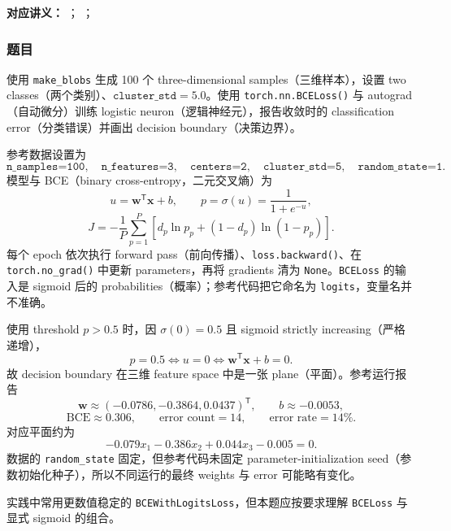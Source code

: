 
\textbf{对应讲义：}
；
；

\subsubsection*{题目}

使用 \texttt{make\_blobs} 生成 100 个 three-dimensional samples（三维样本），设置 two classes（两个类别）、$\texttt{cluster\_std}=5.0$。使用 \texttt{torch.nn.BCELoss()} 与 autograd（自动微分）训练 logistic neuron（逻辑神经元），报告收敛时的 classification error（分类错误）并画出 decision boundary（决策边界）。

\begin{checkedsolution}
参考数据设置为
\[
  \texttt{n\_samples=100},\quad
  \texttt{n\_features=3},\quad
  \texttt{centers=2},\quad
  \texttt{cluster\_std=5},\quad
  \texttt{random\_state=1}.
\]
模型与 BCE（binary cross-entropy，二元交叉熵）为
\[
  u=\bm w^{\mathsf T}\bm x+b,\qquad
  p=\sigma(u)=\frac{1}{1+e^{-u}},
\]
\[
  J=-\frac1P\sum_{p=1}^{P}
  \left[d_p\ln p_p+(1-d_p)\ln(1-p_p)\right].
\]
每个 epoch 依次执行 forward pass（前向传播）、\texttt{loss.backward()}、在 \texttt{torch.no\_grad()} 中更新 parameters，再将 gradients 清为 \texttt{None}。\texttt{BCELoss} 的输入是 sigmoid 后的 probabilities（概率）；参考代码把它命名为 \texttt{logits}，变量名并不准确。

使用 threshold $p>0.5$ 时，因 $\sigma(0)=0.5$ 且 sigmoid strictly increasing（严格递增），
\[
  p=0.5\iff u=0\iff\boxed{\bm w^{\mathsf T}\bm x+b=0}.
\]
故 decision boundary 在三维 feature space 中是一张 plane（平面）。参考运行报告
\[
  \bm w\approx(-0.0786,-0.3864,0.0437)^{\mathsf T},\qquad
  b\approx-0.0053,
\]
\[
  \mathrm{BCE}\approx0.306,\qquad
  \text{error count}=14,\qquad
  \text{error rate}=14\%.
\]
对应平面约为
\[
  -0.079x_1-0.386x_2+0.044x_3-0.005=0.
\]
数据的 \texttt{random\_state} 固定，但参考代码未固定 parameter-initialization
seed（参数初始化种子），所以不同运行的最终 weights 与 error 可能略有变化。

实践中常用更数值稳定的 \texttt{BCEWith\-Logits\-Loss}，但本题应按要求理解
\texttt{BCELoss} 与显式 sigmoid 的组合。
\end{checkedsolution}


